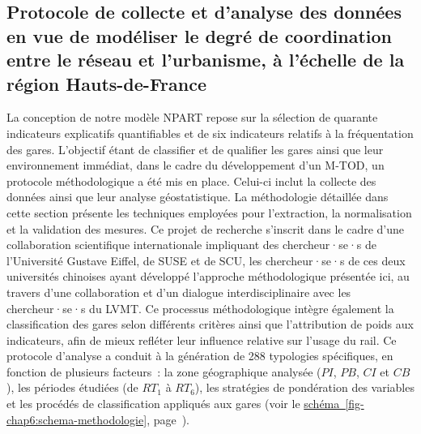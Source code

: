 \begin{refsegment}
    \newpage
\section{Protocole de collecte et d'analyse des données en vue de modéliser le degré de coordination entre le réseau et l'urbanisme, à l’échelle de la région Hauts-de-France
    \label{chap6:methodologie-m-tod-index}
    }

La conception de notre modèle \acrshort{NPART} repose sur la sélection de quarante indicateurs explicatifs quantifiables et de six indicateurs relatifs à la fréquentation des gares. L’objectif étant de classifier et de qualifier les gares ainsi que leur environnement immédiat, dans le cadre du développement d’un \acrshort{M-TOD}, un protocole méthodologique a été mis en place. Celui-ci inclut la collecte des données ainsi que leur analyse géostatistique. La méthodologie détaillée dans cette section présente les techniques employées pour l’extraction, la normalisation et la validation des mesures. Ce projet de recherche s'inscrit dans le cadre d'une collaboration scientifique internationale impliquant des chercheur·se·s de l'Université Gustave Eiffel, de \acrfull{SUSE} et de \acrfull{SCU}, les chercheur·se·s de ces deux universités chinoises ayant développé l'approche méthodologique présentée ici, au travers d’une collaboration et d’un dialogue interdisciplinaire avec les chercheur·se·s du \acrfull{LVMT}. Ce processus méthodologique intègre également la classification des gares selon différents critères ainsi que l’attribution de poids aux indicateurs, afin de mieux refléter leur influence relative sur l'usage du rail. Ce protocole d'analyse a conduit à la génération de 288 typologies spécifiques, en fonction de plusieurs facteurs~: la zone géographique analysée (\(PI\), \(PB\), \(CI\) et \(CB\)), les périodes étudiées (de \(RT_{1}\) à \(RT_{6}\)), les stratégies de pondération des variables et les procédés de classification appliqués aux gares (voir le \hyperref[fig-chap6:schema-methodologie]{schéma~\ref{fig-chap6:schema-methodologie}}, page~\pageref{fig-chap6:schema-methodologie}).%


\end{refsegment}
